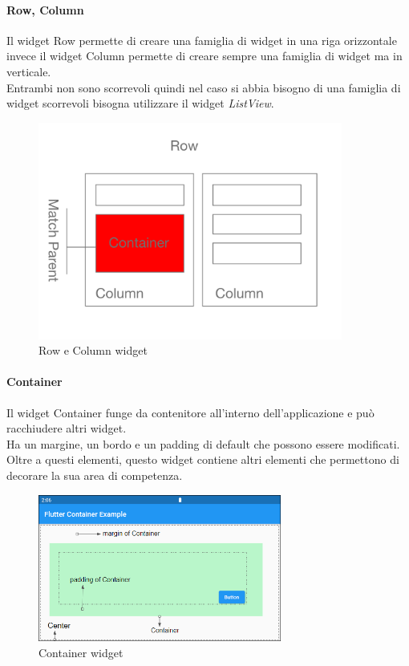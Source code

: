 \paragraph{Row, Column}
Il widget Row permette di creare una famiglia di widget in una riga orizzontale invece il widget Column permette di creare sempre una famiglia di widget ma in verticale.\\
Entrambi non sono scorrevoli quindi nel caso si abbia bisogno di una famiglia di widget scorrevoli bisogna utilizzare il widget \textit{ListView}.
\begin{figure}[htbp]	
	\centering
	\includegraphics[width=10cm]{immagini/rowcolumn.png}
	\caption{Row e Column widget}
	\label{fig:Row e Column widget}
\end{figure}

\newpage

\paragraph{Container}
Il widget Container funge da contenitore all'interno dell'applicazione e può racchiudere altri widget.\\
Ha un margine, un bordo e un padding di default che possono essere modificati.\\
Oltre a questi elementi, questo widget contiene altri elementi che permettono di decorare la sua area di competenza.
\begin{figure}[htbp]	
	\centering
	\includegraphics[width=8cm]{immagini/container.png}
	\caption{Container widget}
	\label{fig:Container widget}
\end{figure}

